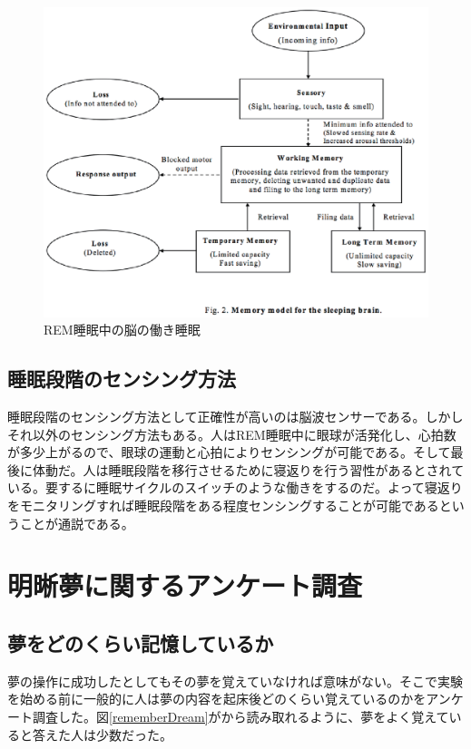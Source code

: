 \begin{figure}[htbp]
\begin{center}
\includegraphics[width=15cm]{eps/sleepBrainModel.eps}
\caption{REM睡眠中の脳の働き睡眠}
\label{brainZhang}
\end{center}
\end{figure}

\subsection{睡眠段階のセンシング方法}
睡眠段階のセンシング方法として正確性が高いのは脳波センサーである。しかしそれ以外のセンシング方法もある。人はREM睡眠中に眼球が活発化し、心拍数が多少上がるので、眼球の運動と心拍によりセンシングが可能である。そして最後に体動だ。人は睡眠段階を移行させるために寝返りを行う習性があるとされている。要するに睡眠サイクルのスイッチのような働きをするのだ。\cite{negaeri}よって寝返りをモニタリングすれば睡眠段階をある程度センシングすることが可能であるということが通説である。

\section{明晰夢に関するアンケート調査}
\subsection{夢をどのくらい記憶しているか}
夢の操作に成功したとしてもその夢を覚えていなければ意味がない。そこで実験を始める前に一般的に人は夢の内容を起床後どのくらい覚えているのかをアンケート調査した。図\ref{rememberDream}がから読み取れるように、夢をよく覚えていると答えた人は少数だった。

